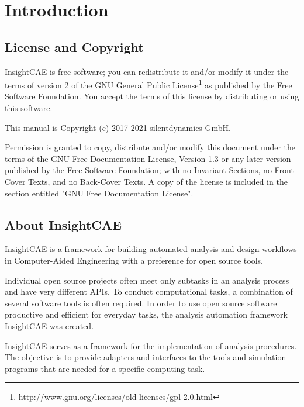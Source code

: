 \section{Introduction}

\subsection{License and Copyright}

InsightCAE is free software; you can redistribute it and/or modify it under the terms of version 2 of the GNU General Public License\footnote{\url{http://www.gnu.org/licenses/old-licenses/gpl-2.0.html}} as published by the Free Software Foundation. You accept the terms of this license by distributing or using this software.

This manual is Copyright (c) 2017-2021 silentdynamics GmbH.

Permission is granted to copy, distribute and/or modify this document under the terms of the GNU Free Documentation License, Version 1.3 or any later version published by the Free Software Foundation; with no Invariant Sections, no Front-Cover Texts, and no Back-Cover Texts. A copy of the license is included in the section entitled "GNU Free Documentation License".

\subsection{About InsightCAE}

InsightCAE is a framework for building automated analysis and design workflows in Computer-Aided Engineering with a preference for open source tools.

Individual open source projects often meet only subtasks in an analysis process and have very different APIs. To conduct computational tasks, a combination of several software tools is often required. In order to use open source software productive and efficient for everyday tasks, the analysis automation framework InsightCAE was created.

InsightCAE serves as a framework for the implementation of analysis procedures. The objective is to provide adapters and interfaces to the tools and simulation programs that are needed for a specific computing task.

